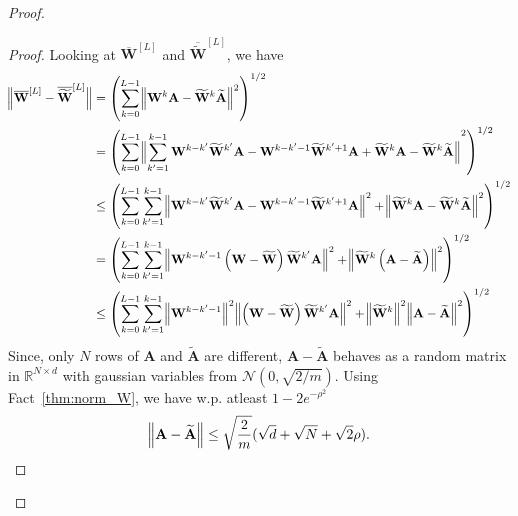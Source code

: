 \begin{claim}
\begin{proof}
				\begin{proof}
					Looking at $\overline{\mathbf{W}}^{[L]}$ and $\overline{\widetilde{\mathbf{W}}}^{[L]}$, we have
					\begin{align}
						\norm[2]{\overline{\mathbf{W}}^{[L]} -  \overline{\widetilde{\mathbf{W}}}^{[L]}} &= \left(\sum_{k=0}^{L-1} \norm[2]{ \mathbf{W}^k \mathbf{A} - \widetilde{\mathbf{W}}^k \widetilde{\mathbf{A}}}^2 \right)^{1/2} \nonumber\\
						&=  \left(\sum_{k=0}^{L-1} \norm[2]{ \sum_{k'=1}^{k-1}  \mathbf{W}^{k-k'} \widetilde{\mathbf{W}}^{k'} \mathbf{A} - \mathbf{W}^{k-k'-1} \widetilde{\mathbf{W}}^{k'+1} \mathbf{A} +  \widetilde{\mathbf{W}}^{k} \mathbf{A} - \widetilde{\mathbf{W}}^{k} \widetilde{\mathbf{A}}}^2 \right)^{1/2} \nonumber\\
						&\le \left(\sum_{k=0}^{L-1} \sum_{k'=1}^{k-1} \norm[2]{ \mathbf{W}^{k-k'} \widetilde{\mathbf{W}}^{k'} \mathbf{A} - \mathbf{W}^{k-k'-1} \widetilde{\mathbf{W}}^{k'+1} \mathbf{A}}^2 + \norm[2]{ \widetilde{\mathbf{W}}^{k} \mathbf{A} - \widetilde{\mathbf{W}}^{k} \widetilde{\mathbf{A}}}^2 \right)^{1/2} \nonumber\\&
						= \left(\sum_{k=0}^{L-1} \sum_{k'=1}^{k-1} \norm[2]{ \mathbf{W}^{k-k'-1} \left(\mathbf{W} - \widetilde{\mathbf{W}}\right)  \widetilde{\mathbf{W}}^{k'} \mathbf{A}}^2 + \norm[2]{ \widetilde{\mathbf{W}}^{k} \left(\mathbf{A} - \widetilde{\mathbf{A}}\right) }^2 \right)^{1/2} \\&
						\le  \left(\sum_{k=0}^{L-1} \sum_{k'=1}^{k-1} \norm[2]{ \mathbf{W}^{k-k'-1}}^2 \norm[2]{\left(\mathbf{W} - \widetilde{\mathbf{W}}\right)  \widetilde{\mathbf{W}}^{k'} \mathbf{A}}^2 + \norm[2]{ \widetilde{\mathbf{W}}^{k}}^2 \norm[2]{\mathbf{A} - \widetilde{\mathbf{A}} }^2 \right)^{1/2} \label{eq:diff_W_tildeW}
					\end{align}
					Since, only $N$ rows of $\mathbf{A}$ and $\widetilde{\mathbf{A}}$ are different, $\mathbf{A} - \widetilde{\mathbf{A}}$ behaves as a random  matrix in $\mathbb{R}^{N \times d}$ with gaussian variables from $\mathcal{N}(0, \sqrt{2/m})$.
					Using Fact~\ref{thm:norm_W}, we have w.p. atleast $1 - 2e^{-\rho^2}$
					\begin{equation*}
						\norm[2]{\mathbf{A} - \widetilde{\mathbf{A}}} \le \sqrt{\frac{2}{m}} (\sqrt{d} + \sqrt{N} + \sqrt{2}\rho).
					\end{equation*}
					

\end{proof}
\end{proof}
\end{claim}
